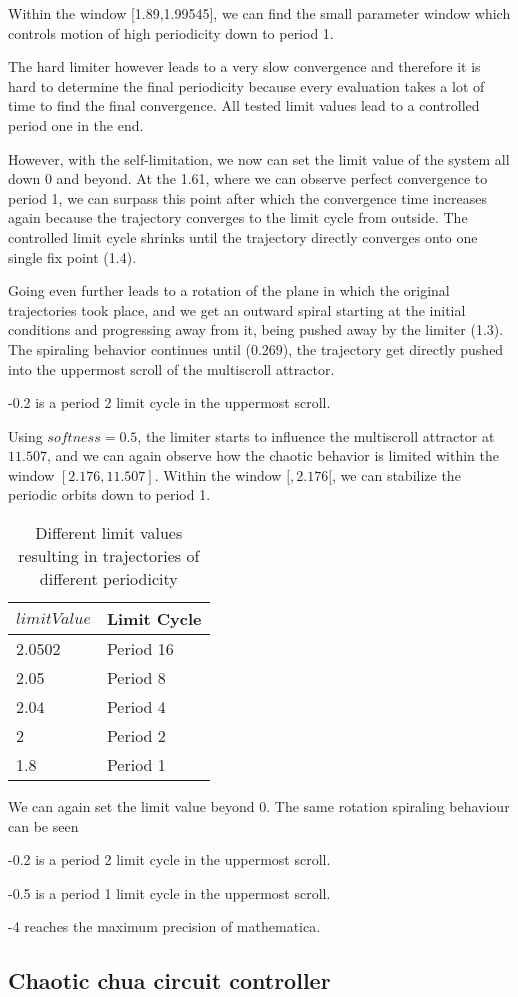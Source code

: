 \documentclass[main]{subfiles}
\begin{document}
Within the window [1.89,1.99545], we can find the small parameter window which controls motion of high periodicity down to period 1.


The hard limiter however leads to a very slow convergence and therefore it is hard to determine the final periodicity because every evaluation takes a lot of time to find the final convergence. All tested limit values lead to a controlled period one in the end.

However, with the self-limitation, we now can set the limit value of the system all down 0 and beyond. At the 1.61, where we can observe perfect convergence to period 1, we can surpass this point after which the convergence time increases again because the trajectory converges to the limit cycle from outside. The controlled limit cycle shrinks until the trajectory directly converges onto one single fix point (1.4). 

Going even further leads to a rotation of the plane in which the original trajectories took place, and we get an outward spiral starting at the initial conditions and progressing away from it, being pushed away by the limiter (1.3). The spiraling behavior continues until (0.269), the trajectory get directly pushed into the uppermost scroll of the multiscroll attractor.

-0.2 is a period 2 limit cycle in the uppermost scroll.


Using \(softness=0.5\), the limiter starts to influence the multiscroll attractor at \(11.507\), and we can again observe how the chaotic behavior is limited within the window \([2.176,11.507]\). Within the window \([,2.176[\), we can stabilize the periodic orbits down to period 1.

\begin{table}[H]
\renewcommand{\arraystretch}{1.2}
\center
\begin{tabular}{@{}ll@{}}
	\toprule
   \(limitValue\) & Limit Cycle\\
   \midrule
   2.0502 & Period 16 \\
   2.05 & Period 8 \\ 
   2.04 & Period 4 \\
   2  & Period 2 \\
   1.8 & Period 1 \\
   \bottomrule
\end{tabular}
\caption{Different limit values resulting in trajectories of different periodicity}
\label{table:x-0.5-periodicities}
\end{table}

 We can again set the limit value beyond 0. The same rotation spiraling behaviour can be seen

-0.2 is a period 2 limit cycle in the uppermost scroll.

-0.5 is a period 1 limit cycle in the uppermost scroll.

-4 reaches the maximum precision of mathematica.

\subsection{Chaotic chua circuit controller}
\end{document}
